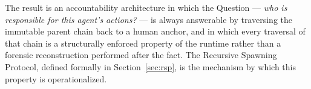 The result is an accountability architecture in which the Question --- \emph{who is responsible for this agent's actions?} --- is always answerable by traversing the immutable parent chain back to a human anchor, and in which every traversal of that chain is a structurally enforced property of the runtime rather than a forensic reconstruction performed after the fact. The Recursive Spawning Protocol, defined formally in Section~\ref{sec:rsp}, is the mechanism by which this property is operationalized.
